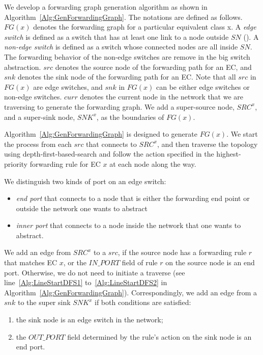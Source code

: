 We develop a forwarding graph generation algorithm as shown in Algorithm~\ref{Alg:GenForwardingGraph}. The notations are defined as follows. $FG(x)$ denotes the forwarding graph for a particular equivalent class x. A \textit{edge switch} is defined as a switch that has at least one link to a node outside $SN$ (). A \textit{non-edge switch} is defined as a switch whose connected nodes are all inside $SN$. The forwarding behavior of the non-edge switches are remove in the big switch abstraction. $src$ denotes the source node of the forwarding path for an EC, and $snk$ denotes the sink node of the forwarding path for an EC. Note that all $src$ in $FG(x)$ are edge switches, and $snk$ in $FG(x)$ can be either edge switches or non-edge switches. $curr$ denotes the current node in the network that we are traversing to generate the forwarding graph. We add a super-source node, $SRC^x$, and a super-sink node, $SNK^x$, as the boundaries of $FG(x)$.

Algorithm~\ref{Alg:GenForwardingGraph} is designed to generate $FG(x)$. We start the process from each $src$ that connects to $SRC^x$, and then traverse the topology using depth-first-based-search and follow the action specified in the highest-priority forwarding rule for EC $x$ at each node along the way. 


We distinguish two kinds of port on an edge switch:
\begin{itemize}
\item \textit{end port} that connects to a node that is either the forwarding end point or outside the network one wants to abstract
\item \textit{inner port} that connects to a node inside the network that one wants to abstract.
\end{itemize}

We add an edge from $SRC^x$ to a $src$, if the source node has a forwarding rule $r$ that matches EC $x$, or the $IN\_PORT$ field of rule $r$ on the source node is an end port. 
Otherwise, we do not need to initiate a traverse (see line~\ref{Alg:LineStartDFS1} to~\ref{Alg:LineStartDFS2} in Algorithm~\ref{Alg:GenForwardingGraph}).
Correspondingly, we add an edge from a $snk$ to the super sink $SNK^x$ if both conditions are satisfied:
\begin{enumerate}
\item the sink node is an edge switch in the network;
\item the $OUT\_PORT$ field determined by the rule's action on the sink node is an end port.
\end{enumerate}

